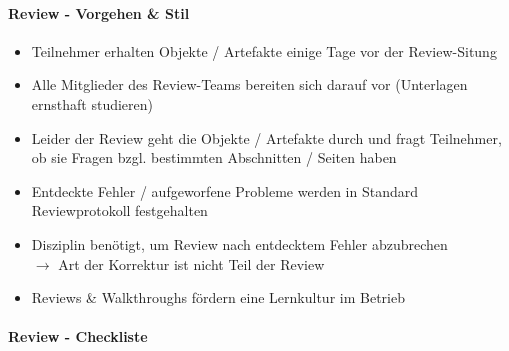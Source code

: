 \documentclass[a4paper]{article}
\begin{document}
				\paragraph{Review - Vorgehen \& Stil}
				
					\begin{itemize}
						\item Teilnehmer erhalten Objekte / Artefakte einige Tage vor der Review-Situng
						\item Alle Mitglieder des Review-Teams bereiten sich darauf vor (Unterlagen ernsthaft studieren)
						\item Leider der Review geht die Objekte / Artefakte durch und fragt Teilnehmer, ob sie Fragen bzgl. bestimmten Abschnitten / Seiten haben
						\item Entdeckte Fehler / aufgeworfene Probleme werden in Standard Reviewprotokoll festgehalten
						\item Disziplin benötigt, um Review nach entdecktem Fehler abzubrechen\\
							$\rightarrow$ Art der Korrektur ist nicht Teil der Review
						\item Reviews \& Walkthroughs fördern eine Lernkultur im Betrieb
					\end{itemize}
				
				\paragraph{Review - Checkliste}
				
\end{document}

